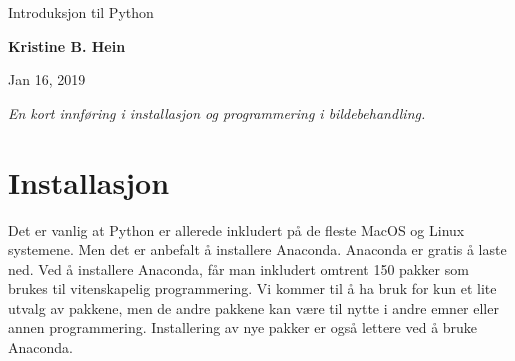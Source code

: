 \documentclass[%
oneside,                 %
final,                   %
10pt]{article}
\begin{document}

\newcommand{\exercisesection}[1]{\subsection*{#1}}






\thispagestyle{empty}

\begin{center}
{\LARGE\bf
\begin{spacing}{1.25}
{\color{seccolor} Introduksjon til Python}
\end{spacing}
}
\end{center}


\begin{center}
{\bf Kristine B. Hein${}^{}$} \\ [0mm]
\end{center}

\begin{center}
\end{center}
    

\begin{center}
Jan 16, 2019
\end{center}

\vspace{1cm}


\emph{En kort innføring i installasjon og programmering i bildebehandling.}




\tableofcontents


\vspace{1cm} %




\section{Installasjon}
Det er vanlig at Python er allerede inkludert på de fleste MacOS og Linux systemene.
Men det er anbefalt å installere Anaconda. Anaconda er gratis å laste ned. Ved å installere Anaconda, får man inkludert omtrent 150 pakker som brukes til vitenskapelig programmering. Vi kommer til å ha bruk for kun et lite utvalg av pakkene, men de andre pakkene kan være til nytte i andre emner eller annen programmering.
Installering av nye pakker er også lettere ved å bruke Anaconda.
\end{document}
